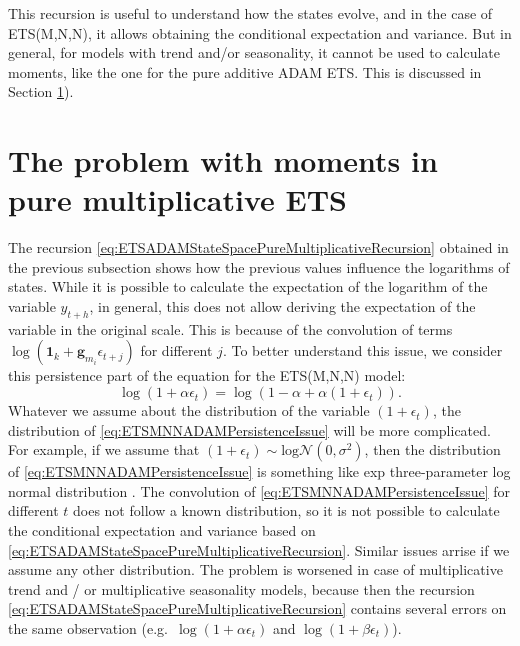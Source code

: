 \documentclass[
]{book}
\theoremstyle{definition}
\theoremstyle{definition}
\theoremstyle{definition}
\theoremstyle{definition}
\theoremstyle{remark}
\begin{document}
This recursion is useful to understand how the states evolve, and in the case of ETS(M,N,N), it allows obtaining the conditional expectation and variance. But in general, for models with trend and/or seasonality, it cannot be used to calculate moments, like the one for the pure additive ADAM ETS. This is discussed in Section \ref{pureMultiplicativeExpectationAndVariance}).

\hypertarget{pureMultiplicativeExpectationAndVariance}{%
\section{The problem with moments in pure multiplicative ETS}\label{pureMultiplicativeExpectationAndVariance}}

The recursion \eqref{eq:ETSADAMStateSpacePureMultiplicativeRecursion} obtained in the previous subsection shows how the previous values influence the logarithms of states. While it is possible to calculate the expectation of the logarithm of the variable \(y_{t+h}\), in general, this does not allow deriving the expectation of the variable in the original scale. This is because of the convolution of terms \(\log(\mathbf{1}_k + \mathbf{g}_{m_i} \epsilon_{t+j})\) for different \(j\). To better understand this issue, we consider this persistence part of the equation for the ETS(M,N,N) model:
\begin{equation}
    \log(1+\alpha\epsilon_t) = \log(1-\alpha + \alpha(1+\epsilon_t)).
  \label{eq:ETSMNNADAMPersistenceIssue}
\end{equation}
Whatever we assume about the distribution of the variable \((1+\epsilon_t)\), the distribution of \eqref{eq:ETSMNNADAMPersistenceIssue} will be more complicated. For example, if we assume that \((1+\epsilon_t)\sim\mathrm{log}\mathcal{N}(0,\sigma^2)\), then the distribution of \eqref{eq:ETSMNNADAMPersistenceIssue} is something like exp three-parameter log normal distribution \citep{Sangal1970}. The convolution of \eqref{eq:ETSMNNADAMPersistenceIssue} for different \(t\) does not follow a known distribution, so it is not possible to calculate the conditional expectation and variance based on \eqref{eq:ETSADAMStateSpacePureMultiplicativeRecursion}. Similar issues arrise if we assume any other distribution. The problem is worsened in case of multiplicative trend and / or multiplicative seasonality models, because then the recursion \eqref{eq:ETSADAMStateSpacePureMultiplicativeRecursion} contains several errors on the same observation (e.g.~\(\log(1+\alpha\epsilon_t)\) and \(\log(1+\beta\epsilon_t)\)).
\end{document}
